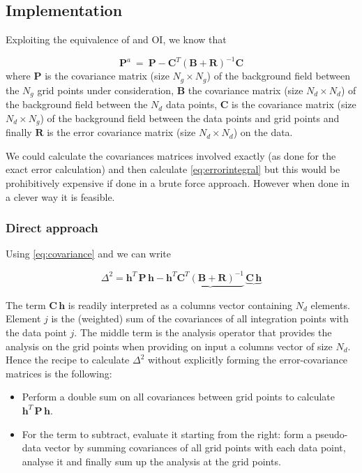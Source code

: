 \subsection{Implementation}
Exploiting the equivalence of \diva and OI, we know that

\begin{equation}
\mathbf{P}^a ~=~ \mathbf{P} -  \mathbf{C}^T \left( \mathbf{B}+\mathbf{R} \right)^{-1} \mathbf{C}
\label{eq:covariance}
\end{equation}
where $\mathbf{P}$ is the covariance matrix (size $N_g\times N_g$) of the background field between the $N_g$ grid points under consideration, $\mathbf{B}$ 
the covariance matrix (size $N_d \times N_d$) of the background field between the $N_d$ data points, $\mathbf{C}$  is the
 covariance matrix (size $N_d \times N_g$) of the background field between the  data points and grid points and finally $\mathbf{R}$ is the error covariance matrix (size $N_d \times N_d$) on the data.
 
We could calculate the covariances matrices involved exactly (as done for the exact error calculation) and then calculate \eqref{eq:errorintegral} but this would be prohibitively expensive if done in a brute force approach. However when done in a clever way it is feasible.

\subsubsection{Direct approach}

Using \eqref{eq:covariance} and \label{eq:errorintegral} we can write

 \begin{equation}
 \Delta^2 = \mathbf{h}^T \, \mathbf{P} \, \mathbf{h} - \mathbf{h}^T \underbrace{\mathbf{C}^T \left( \mathbf{B}+\mathbf{R} \right)^{-1}} \, \underbrace{\mathbf{C}  \, \mathbf{h}}
 \label{eq:totalerror}
 \end{equation}
 
The term $\mathbf{C}  \, \mathbf{h}$ is readily interpreted as a columns vector containing $N_d$ elements. Element $j$ is the (weighted) sum of the covariances of all integration points with the data point $j$. The middle term is the analysis operator that provides the analysis on the grid points when providing on input a columns vector of size $N_d$. Hence the recipe to calculate $\Delta^2$ without explicitly forming the error-covariance matrices is the following:
\begin{itemize}
\item Perform a double sum on all covariances between grid points to calculate $\mathbf{h}^T \, \mathbf{P} \, \mathbf{h}$.
\item For the term to subtract, evaluate it starting from the right: form a pseudo-data vector by summing covariances of all grid points with each data point, analyse it and finally sum up the analysis at the grid points.
\end{itemize}


